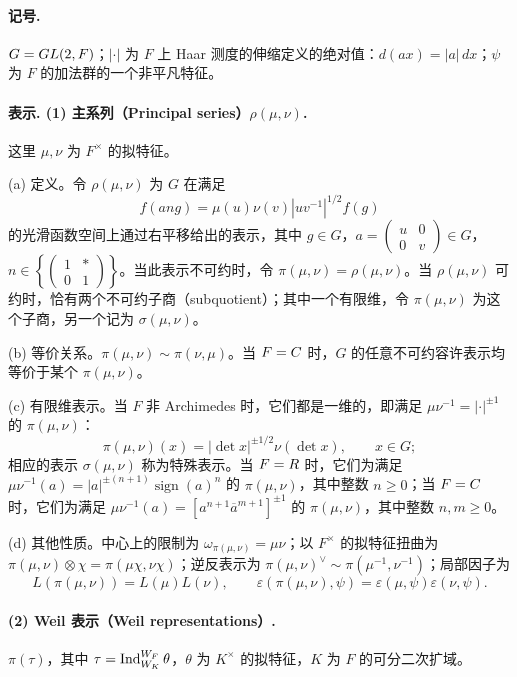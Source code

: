 \paragraph*{记号.}
$G=GL(2,F)$；$|\cdot|$ 为 $F$ 上 Haar 测度的伸缩定义的绝对值：$d(ax)=|a|\,dx$；$\psi$ 为 $F$ 的加法群的一个非平凡特征。

\paragraph*{表示. (1) 主系列（Principal series）$\rho(\mu,\nu)$.}
这里 $\mu,\nu$ 为 $F^\times$ 的拟特征。

(a) 定义。令 $\rho(\mu,\nu)$ 为 $G$ 在满足
\[
 f(ang)=\mu(u)\nu(v)|uv^{-1}|^{1/2}f(g)
\]
的光滑函数空间上通过右平移给出的表示，其中 $g\in G$，$a=\begin{pmatrix}u&0\\0&v\end{pmatrix}\in G$，$n\in\left\{\begin{pmatrix}1&*\\0&1\end{pmatrix}\right\}$。当此表示不可约时，令 $\pi(\mu,\nu)=\rho(\mu,\nu)$。当 $\rho(\mu,\nu)$ 可约时，恰有两个不可约子商（subquotient）；其中一个有限维，令 $\pi(\mu,\nu)$ 为这个子商，另一个记为 $\sigma(\mu,\nu)$。

(b) 等价关系。$\pi(\mu,\nu)\sim\pi(\nu,\mu)$。当 $F=C$ 时，$G$ 的任意不可约容许表示均等价于某个 $\pi(\mu,\nu)$。

(c) 有限维表示。当 $F$ 非 Archimedes 时，它们都是一维的，即满足 $\mu\nu^{-1}=|\cdot|^{\pm1}$ 的 $\pi(\mu,\nu)$：
\[
 \pi(\mu,\nu)(x)=|\det x|^{\pm1/2}\nu(\det x),\qquad x\in G;
\]
相应的表示 $\sigma(\mu,\nu)$ 称为特殊表示。当 $F=R$ 时，它们为满足 $\mu\nu^{-1}(a)=|a|^{\pm(n+1)}\operatorname{sign}(a)^n$ 的 $\pi(\mu,\nu)$，其中整数 $n\ge0$；当 $F=C$ 时，它们为满足 $\mu\nu^{-1}(a)=[a^{n+1}\overline a^{m+1}]^{\pm1}$ 的 $\pi(\mu,\nu)$，其中整数 $n,m\ge0$。

(d) 其他性质。中心上的限制为 $\omega_{\pi(\mu,\nu)}=\mu\nu$；以 $F^\times$ 的拟特征扭曲为 $\pi(\mu,\nu)\otimes\chi=\pi(\mu\chi,\nu\chi)$；逆反表示为 $\pi(\mu,\nu)^\vee\sim\pi(\mu^{-1},\nu^{-1})$；局部因子为
\[
 L(\pi(\mu,\nu))=L(\mu)L(\nu),\qquad
 \varepsilon(\pi(\mu,\nu),\psi)=\varepsilon(\mu,\psi)\varepsilon(\nu,\psi).
\]

\paragraph*{(2) Weil 表示（Weil representations）.}
$\pi(\tau)$，其中 $\tau=\operatorname{Ind}_{W_K}^{W_F}\theta$，$\theta$ 为 $K^\times$ 的拟特征，$K$ 为 $F$ 的可分二次扩域。

